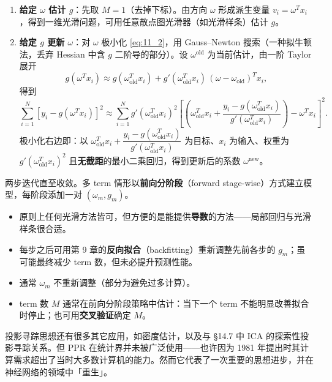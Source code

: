\begin{enumerate}
\item \textbf{给定 $\omega$ 估计 $g$}：先取 $M=1$（去掉下标）。由方向 $\omega$ 形成派生变量 $v_i = \omega^T x_i$，得到一维光滑问题，可用任意散点图光滑器（如光滑样条）估计 $g$。
\item \textbf{给定 $g$ 更新 $\omega$}：对 $\omega$ 极小化 \ref{eq:11_2}，用 Gauss--Newton 搜索（一种拟牛顿法，丢弃 Hessian 中含 $g$ 二阶导的部分）。设 $\omega^{\mathrm{old}}$ 为当前估计，由一阶 Taylor 展开
\begin{equation}
g(\omega^T x_i) \approx g(\omega_{\mathrm{old}}^T x_i) + g'(\omega_{\mathrm{old}}^T x_i)\,(\omega-\omega_{\mathrm{old}})^T x_i, \label{eq:11_3}
\end{equation}
得到
\begin{equation}
\sum_{i=1}^{N} \left[ y_i - g(\omega^T x_i) \right]^2
\approx
\sum_{i=1}^{N} g'(\omega_{\mathrm{old}}^T x_i)^2
\left[
\left( \omega_{\mathrm{old}}^T x_i + \frac{y_i - g(\omega_{\mathrm{old}}^T x_i)}{g'(\omega_{\mathrm{old}}^T x_i)} \right) - \omega^T x_i
\right]^2. \label{eq:11_4}
\end{equation}
极小化右边即：以 $\omega_{\mathrm{old}}^T x_i + \dfrac{y_i - g(\omega_{\mathrm{old}}^T x_i)}{g'(\omega_{\mathrm{old}}^T x_i)}$ 为目标、$x_i$ 为输入、权重为 $g'(\omega_{\mathrm{old}}^T x_i)^2$ 且\textbf{无截距}的最小二乘回归，得到更新后的系数 $\omega^{\mathrm{new}}$。
\end{enumerate}

两步迭代直至收敛。多 term 情形以\textbf{前向分阶段}（forward stage-wise）方式建立模型，每阶段添加一对 $(\omega_m, g_m)$。

\begin{remark}[实现细节]
\begin{itemize}
\item 原则上任何光滑方法皆可，但方便的是能提供\textbf{导数}的方法——局部回归与光滑样条很合适。
\item 每步之后可用第 9 章的\textbf{反向拟合}（backfitting）重新调整先前各步的 $g_m$；虽可能最终减少 term 数，但未必提升预测性能。
\item 通常 $\omega_m$ 不重新调整（部分为避免过多计算）。
\item term 数 $M$ 通常在前向分阶段策略中估计：当下一个 term 不能明显改善拟合时停止；也可用\textbf{交叉验证}确定 $M$。
\end{itemize}
\end{remark}

\begin{remark}
投影寻踪思想还有很多其它应用，如密度估计，以及与 §14.7 中 ICA 的探索性投影寻踪关系。但 PPR 在统计界并未被广泛使用——也许因为 1981 年提出时其计算需求超出了当时大多数计算机的能力。然而它代表了一次重要的思想进步，并在神经网络的领域中「重生」。
\end{remark}

